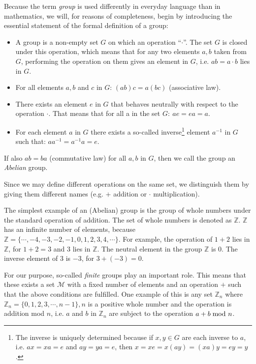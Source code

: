 Because the term {\em group} is used differently in everyday language than in
mathematics, we will, for reasons of completeness, begin by introducing the
essential statement of the formal definition of a group:
\begin{itemize}
   \item A group is a non-empty set $G$ on which an operation ``$\cdot$''. The set $G$ is closed under this operation, which means that for any two elements $a, b$ taken from $G$, performing the operation on them gives an element in $G$, i.e. $ab=a\cdot b$ lies in $G$.
   \item For all elements $a, b$ and $c$ in $G$: $(ab)c = a(bc)$ (associative law).
   \item There exists an element $e$ in $G$ that behaves neutrally with respect
to the operation $\cdot$. That means that for all a in the set $G: ~ae = ea = a$.
   \item For each element $a$ in $G$ there exists a so-called inverse\footnote{The inverse is uniquely determined because if $x,y\in G$ are each inverse to $a$, i.e. $ax=xa=e$ and $ay=ya=e$, then $x=xe=x(ay)=(xa)y=ey=y$.} element $a^{-1}$ in $G$ such that: $aa^{-1} = a^{-1}a = e$.
\end{itemize}
If also $ab = ba$ (commutative law) for all $a, b$ in $G$, then we call the group an {\em Abelian} group.

Since we may define different operations on the same set, we distinguish them by giving them different names (e.g. $+$ addition or $\cdot$ multiplication).

The simplest example of an (Abelian) group is the group of whole numbers under
the standard operation of addition. The set of whole numbers is denoted as
${\mathbb Z}$. ${\mathbb Z}$ has an infinite number of elements, because
${\mathbb Z} = \{ \cdots, -4, -3, -2, -1, 0, 1, 2, 3, 4, \cdots\}$. For example, the
operation of $1+2$ lies in ${\mathbb Z}$, for $1+2 = 3$ and $3$ lies in
${\mathbb Z}$. The neutral element in the group ${\mathbb Z}$ is $0$. The
inverse element of $3$ is $-3$, for $3+(-3) = 0$.

For our purpose, so-called {\em finite} groups play an important role. This means that these exists a set
$\mathcal{M}$ with a fixed number of elements and an operation $+$ such that the
above conditions are fulfilled. One example of this is any set ${\mathbb Z}_n$
where ${\mathbb Z}_n = \{0, 1, 2, 3, \cdots, n-1\}, n$ is a positive whole number
and the operation is addition mod $n$, i.e. $a$ and $b$ in ${\mathbb Z}_n$ are
subject to the operation $a+b \;{\rm mod~} n$.

